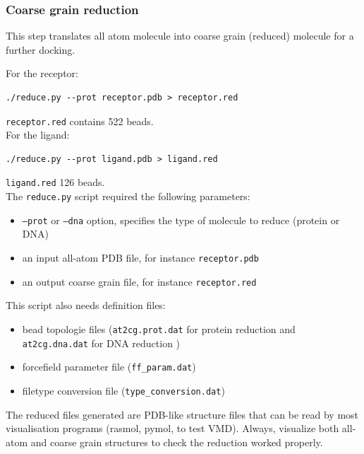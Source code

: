 \documentclass[12pt,a4paper]{article}
\begin{document}
\subsubsection{Coarse grain reduction}

This step translates all atom molecule into coarse grain (reduced) molecule for a further docking. 

For the receptor: 
\begin{verbatim}
./reduce.py --prot receptor.pdb > receptor.red
\end{verbatim}
{\tt receptor.red} contains 522 beads.\\

For the ligand:
\begin{verbatim}
./reduce.py --prot ligand.pdb > ligand.red
\end{verbatim}
{\tt ligand.red} 126 beads. \\

The {\tt reduce.py} script required the following parameters:

\begin{itemize}
\item {\tt --prot} or {\tt --dna} option, specifies the type of molecule to reduce (protein or DNA)
\item an input all-atom PDB file, for instance {\tt receptor.pdb}
\item an output coarse grain file, for instance {\tt receptor.red}
\end{itemize}

This script also needs definition files:

\begin{itemize}
\item bead topologie files ({\tt at2cg.prot.dat} for protein reduction and {\tt at2cg.dna.dat} for DNA reduction )
\item forcefield parameter file ({\tt ff\_param.dat})
\item filetype conversion file ({\tt type\_conversion.dat})
\end{itemize}

The reduced files generated are PDB-like structure files that can be read by most visualisation
programs (rasmol, pymol, to test VMD). 
Always, visualize both all-atom and coarse grain structures to check the reduction worked properly.
\end{document}
